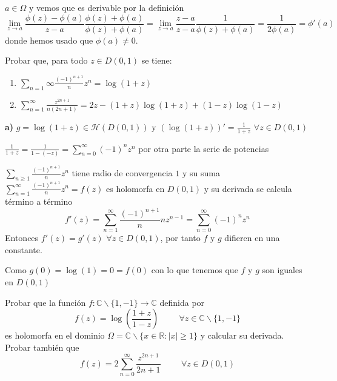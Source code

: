 \begin{sol}
$a\in\Omega$ y vemos que es derivable por la definición
$$\lim_{z\rightarrow a} \frac{\phi(z)-\phi(a)}{z-a} \frac{\phi(z)+\phi(a)}{\phi(z)+\phi(a)} = \lim_{z\rightarrow a} \frac{z-a}{z-a} \frac{1}{\phi(z)+\phi(a)} = \frac{1}{2\phi(a)} = \phi '(a)$$
donde hemos usado que $\phi(a)\not = 0$.

\end{sol}



\begin{ejer}
	Probar que, para todo $z \in D(0, 1)$ se tiene:
	\begin{enumerate}[label=(\alph*)]
		\item $\sum_{n=1}{\infty} \frac{(-1)^{n+1}}{n} z^n = \log(1+z)$
		\item $\sum_{n=1}^{\infty} \frac{z^{2n+1}}{n(2n+1)} = 2z-(1+z)\log(1+z)+(1-z)\log(1-z)$
	\end{enumerate}
\end{ejer}

\begin{sol}

\textbf{a)}
$g = \log (1+z) \in\mathcal{H}(D(0,1))$ y $(\log (1+z))' = \frac{1}{1+z}$ $\forall z\in D(0,1)$

$\frac{1}{1+z} = \frac{1}{1-(-z)} = \sum_{n=0}^{\infty} (-1)^n z^n$
por otra parte la serie de potencias 

$\sum_{n\geq 1} \frac{(-1)^{n+1}}{n} z^n$ tiene radio de convergencia $1$
y su suma $\sum_{n=1}^{\infty} \frac{(-1)^{n+1}}{n} z^n = f(z)$ es holomorfa en $D(0,1)$ y su derivada se calcula término a término
$$f'(z) = \sum_{n=1}^{\infty} \frac{(-1)^{n+1}}{n} n z^{n-1} = \sum_{n=0}^{\infty} (-1)^{n}z^{n}$$
Entonces $f'(z) = g'(z)$ $\forall z\in D(0,1)$, por tanto $f$ y $g$ difieren en una constante.

Como $g(0) = \log(1) = 0 = f(0)$
con lo que tenemos que $f$ y $g$ son iguales en $D(0,1)$

\end{sol}




\begin{ejer}
	Probar que la función $f:\mathbb{C}\backslash\{1,-1\}\rightarrow\mathbb{C}$ definida por
	$$ f(z) = \log\left( \frac{1+z}{1-z} \right) \hspace{1cm} \forall z\in\mathbb{C}\backslash\{1,-1\} $$
	es holomorfa en el dominio $\Omega = \mathbb{C}\backslash\{ x\in\mathbb{R} : |x|\geq 1 \}$ y calcular su derivada. Probar también que
	$$ f(z) = 2\sum_{n=0}^{\infty} \frac{z^{2n+1}}{2n+1} \hspace{1cm} \forall z\in D(0,1) $$
\end{ejer}


